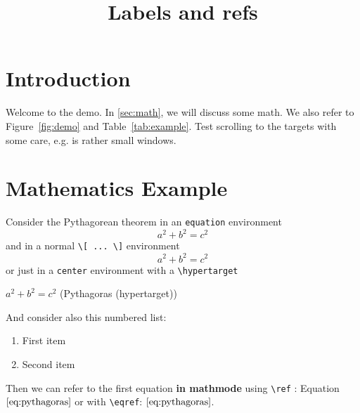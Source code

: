 \documentclass{ximera}
\title{Labels and refs}
\begin{document}
\begin{abstract}
\end{abstract}
\maketitle
\label{xim:labels}




\section{Introduction}
\label{sec:intro}

Welcome to the demo. In \autoref{sec:math}, we will discuss some math.
We also refer to Figure~\ref{fig:demo} and Table~\ref{tab:example}.
Test scrolling to the targets with some care, e.g. is rather small windows.

\section{Mathematics Example}
\label{sec:math}

Consider the Pythagorean theorem in an \verb|equation| environment
\begin{equation}
  a^2 + b^2 = c^2   \label{eq:pythagoras}
\end{equation}
and in a normal \verb|\[ ... \]| environment
\[
  a^2 + b^2 = c^2   \tag{Pythagoras} \label{eq:tag:pythagoras}
\]
or just in a \verb|center| environment with a \verb|\hypertarget|
\begin{center}
  $a^2 + b^2 = c^2$  \hfill  \hypertarget{ht:pythagoras}{(Pythagoras (hypertarget))}
\end{center}

And consider also this numbered list:
\begin{enumerate}
  \item First item \label{itm:first}
  \item Second item \label{itm:second}
\end{enumerate}


Then we can refer to the first equation \textbf{in mathmode} using \verb|\ref| : Equation~$\ref{eq:pythagoras}$ or with \verb|\eqref|: $\eqref{eq:pythagoras}$.
\end{document}
